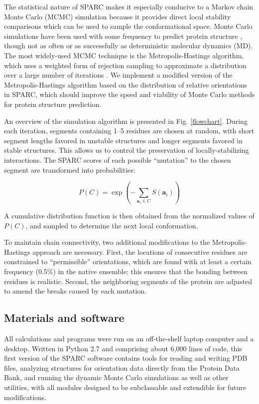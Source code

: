 \documentclass[11pt,titlepage]{article}
\begin{document}
The statistical nature of SPARC makes it especially conducive to a Markov chain Monte Carlo (MCMC) simulation because it provides direct local stability comparisons which can be used to sample the conformational space.
Monte Carlo simulations have been used with some frequency to predict protein structure \cite{kolinski,enciso}, though not as often or as successfully as deterministic molecular dynamics (MD).
The most widely-used MCMC technique is the Metropolis-Hastings algorithm, which uses a weighted form of rejection sampling to approximate a distribution over a large number of iterations \cite{metropolis}.
We implement a modified version of the Metropolis-Hastings algorithm based on the distribution of relative orientations in SPARC, which should improve the speed and viability of Monte Carlo methods for protein structure prediction.

An overview of the simulation algorithm is presented in Fig. \ref{flowchart}.
During each iteration, segments containing 1--5 residues are chosen at random, with short segment lengths favored in unstable structures and longer segments favored in stable structures.
This allows us to control the preservation of locally-stabilizing interactions.
The SPARC scores of each possible ``mutation'' to the chosen segment are transformed into probabilities:

\begin{equation}
P(C) = \exp{\left(-\sum_{\textbf{a}_i\in C}S(\textbf{a}_i)\right)}
\label{probability_eq}
\end{equation}

A cumulative distribution function is then obtained from the normalized values of $P(C)$, and sampled to determine the next local conformation.

To maintain chain connectivity, two additional modifications to the Metropolis-Hastings approach are necessary. 
First, the locations of consecutive residues are constrained to ``permissible'' orientations, which are found with at least a certain frequency (0.5\%) in the native ensemble; this ensures that the bonding between residues is realistic.
Second, the neighboring segments of the protein are adjusted to amend the breaks caused by each mutation.

\subsection{Materials and software}
\label{materials}
All calculations and programs were run on an off-the-shelf laptop computer and a desktop.
Written in Python 2.7 and comprising about 6,000 lines of code, this first version of the SPARC software contains tools for reading and writing PDB files, analyzing structures for orientation data directly from the Protein Data Bank, and running the dynamic Monte Carlo simulations as well as other utilities, with all modules designed to be subclassable and extendible for future modifications.
\end{document}
